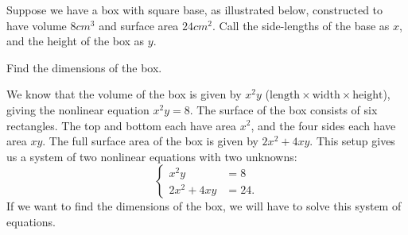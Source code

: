 \documentclass[nooutcomes]{ximera}
\begin{document}
	\begin{exercise}
		Suppose we have a box with square base, as illustrated below, constructed to have volume $8 cm^3$ and surface area $24 cm^2$. 
		Call the side-lengths of the base as $x$, and the height of the box as $y$.
		\begin{image}
		\end{image}
		Find the dimensions of the box.
		
		\begin{explanation}	
			We know that the volume of the box is given by $x^2y$ ($\text{length} \times \text{width} \times \text{height}$), giving the nonlinear equation
			 $x^2y = 8$. The surface of the box consists of six rectangles. The top and bottom each have area $x^2$, and the four sides each have 
			 area $xy$. The full surface area of the box is given by $2x^2 + 4xy$.
			This setup gives us a system of two nonlinear equations with two unknowns:
			$$	\begin{cases}
					x^2 y &= 8\\
					2x^2 + 4xy &= 24.
				\end{cases}	$$
			If we want to find the dimensions of the box, we will have to solve this system of equations.
			

\end{explanation}
\end{exercise}
\end{document}
